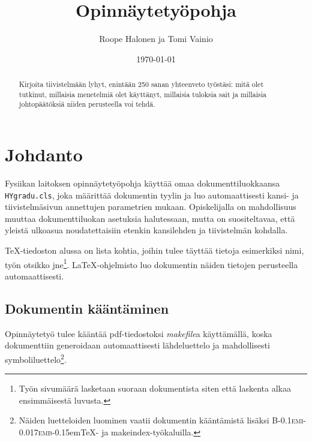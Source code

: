 \documentclass[finnish,twoside,openright,utf]{HYgradu}
\title{Opinnäytetyöpohja}
\author{Roope Halonen ja Tomi Vainio}
\date{\today}
\begin{document}
\maketitle


\begin{abstract}
Kirjoita tiivistelmään lyhyt, enintään 250 sanan yhteenveto työstäsi: mitä olet tutkinut, millaisia menetelmiä olet käyttänyt, millaisia tuloksia sait ja millaisia johtopäätöksiä niiden perusteella voi tehdä.
\end{abstract}

\mytableofcontents

\mynomenclature

\chapter{Johdanto}

Fysiikan laitoksen opinnäytetyöpohja käyttää omaa dokumenttiluokkaansa \texttt{HYgradu.cls}, joka määrittää dokumentin tyylin ja luo automaattisesti kansi- ja tiivistelmäsivun annettujen parametrien mukaan. Opiskelijalla on mahdollisuus muuttaa dokumenttiluokan asetuksia halutessaan, mutta on suositeltavaa, että yleistä ulkoasua noudatettaisiin etenkin kansilehden ja tiivistelmän kohdalla.

\TeX-tiedoston alussa on lista kohtia, joihin tulee täyttää tietoja esimerkiksi nimi, työn otsikko jne\footnote{Työn sivumäärä lasketaan suoraan dokumentista siten että laskenta alkaa ensimmäisestä luvusta.}. \LaTeX-ohjelmisto luo dokumentin näiden tietojen perusteella automaattisesti.

\section{Dokumentin kääntäminen}
\label{sec:compile}

Opinnäytetyö tulee kääntää pdf-tiedostoksi \emph{makefile}a käyttämällä, koska dokumenttiin generoidaan automaattisesti lähdeluettelo ja mahdollisesti symboliluettelo\footnote{Näiden luetteloiden luominen vaatii dokumentin kääntämistä lisäksi \textsc{B\kern-0.1emi\kern-0.017emb}\kern-0.15em\TeX- ja makeindex-työkaluilla.}.
\end{document}
